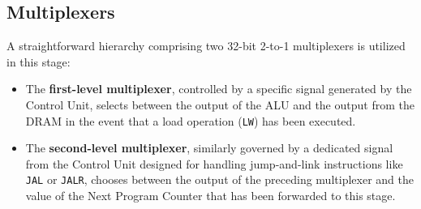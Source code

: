 \subsection{Multiplexers}
A straightforward hierarchy comprising two 32-bit 2-to-1 multiplexers is utilized in this stage:
\begin{itemize}
    \item The \textbf{first-level multiplexer}, controlled by a specific signal generated by the Control Unit, selects between the output of the ALU and the output from the DRAM in the event that a load operation (\texttt{LW}) has been executed.
    \item The \textbf{second-level multiplexer}, similarly governed by a dedicated signal from the Control Unit designed for handling jump-and-link instructions like \texttt{JAL} or \texttt{JALR}, chooses between the output of the preceding multiplexer and the value of the Next Program Counter that has been forwarded to this stage.
\end{itemize}
